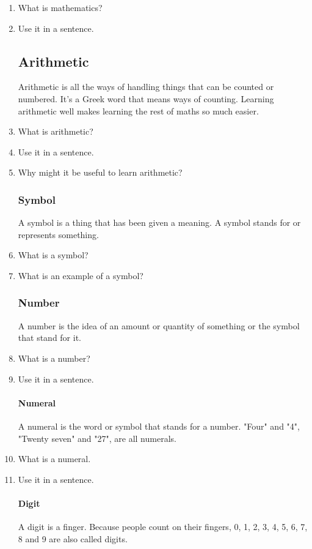 \documentclass{article}
\begin{document}
\begin{enumerate}
\item What is mathematics?
\item Use it in a sentence.

\subsection*{Arithmetic} Arithmetic is all the ways of handling things that can be counted or numbered. It's a Greek word that means ways of counting. Learning arithmetic well makes learning the rest of maths so much easier.

\item What is arithmetic?
\item Use it in a sentence.
\item Why might it be useful to learn arithmetic?

\newpage

\subsubsection*{Symbol}
A symbol is a thing that has been given a meaning. A symbol stands for or represents something.

\item What is a symbol?
\item What is an example of a symbol?

\subsubsection*{Number}
A number is the idea of an amount or quantity of something or the symbol that stand for it.

\item What is a number?
\item Use it in a sentence.

\paragraph{Numeral}
A numeral is the word or symbol that stands for a number. "Four" and "4", "Twenty seven" and "27", are all numerals.

\item What is a numeral.
\item Use it in a sentence.

\paragraph{Digit}
A digit is a finger. Because people count on their fingers, 0, 1, 2, 3, 4, 5, 6, 7, 8 and 9 are also called digits.


\end{enumerate}
\end{document}
